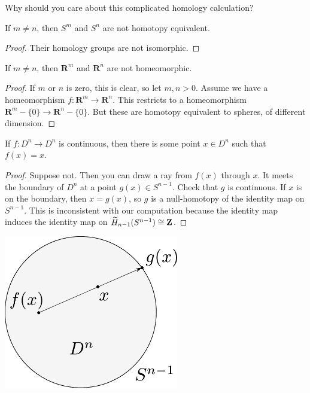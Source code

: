 Why should you care about this complicated homology calculation?
\begin{corollary}
If $m\neq n$, then $S^m$ and $S^n$ are not homotopy equivalent.
\end{corollary}
\begin{proof}
Their homology groups are not isomorphic.
\end{proof}
\begin{corollary}
If $m\neq n$, then $\mathbf{R}^m$ and $\mathbf{R}^n$ are not homeomorphic.
\end{corollary}
\begin{proof}
If $m$ or $n$ is zero, this is clear, so 
let $m,n>0$. Assume we have a homeomorphism $f:\mathbf{R}^m\to \mathbf{R}^n$. This restricts to a homeomorphism $\mathbf{R}^m-\{0\}\to \mathbf{R}^n-\{0\}$.
But these are homotopy equivalent to spheres, of different dimension.
\end{proof}
\begin{theorem}
If $f:D^n\to D^n$ is continuous, 
then there is some point $x\in D^n$ such that $f(x)=x$.
\end{theorem}
\begin{proof}
Suppose not. Then you can draw a ray from $f(x)$ through $x$. It meets the boundary of $D^n$ at a point $g(x)\in S^{n-1}$. Check that $g$ is continuous. If $x$ is on the boundary, then $x=g(x)$, so $g$ is a null-homotopy of the identity map on $S^{n-1}$. This is inconsistent with our computation because the identity map induces the identity map on $\widetilde H_{n-1}(S^{n-1})\cong\mathbf Z$.
\end{proof}

\begin{center}
\includegraphics[width=3in]{905/Figures/10-Brouwer-FPT.pdf}
\end{center}


